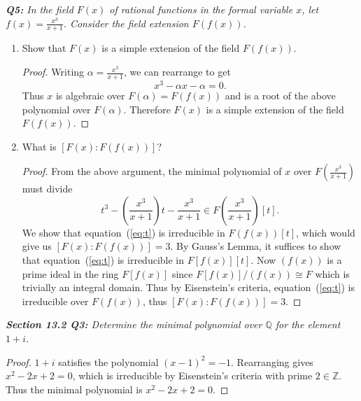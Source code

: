 \documentclass{article}
\begin{document}
\it \textbf{Q5:} In the field $F(x)$ of rational functions in the formal
  variable $x$, let $f(x)=\frac{x^3}{x+1}$. Consider the field extension
  $F(f(x))$.

  \begin{enumerate}[label={(\alph*)}]
    \item Show that $F(x)$ is a simple extension of the field $F(f(x))$.
      \begin{proof}
        Writing $\alpha=\frac{x^3}{x+1}$, we can rearrange to get
        \begin{equation}
          x^3-\alpha x-\alpha=0.
          \label{eq:x}
        \end{equation}
        Thus $x$ is algebraic over $F(\alpha)=F(f(x))$ and is a root of the
        above polynomial over $F(\alpha)$. Therefore $F(x)$ is a simple
        extension of the field $F(f(x))$.
      \end{proof}

    \item What is $[F(x):F(f(x))]$?
      \begin{proof}
        From the above argument, the minimal polynomial of $x$ over
        $F\left(\frac{x^3}{x+1} \right)$ must divide
        \begin{equation}
          t^3 -\left(\frac{x^3}{x+1} \right)t
          -\frac{x^3}{x+1}\in F\left(\frac{x^3}{x+1} \right)[t].
          \label{eq:t}
        \end{equation}
        We show that equation~(\ref{eq:t}) is irreducible in $F(f(x))[t]$,
        which would give us $[F(x):F(f(x))]=3$. By Gauss's Lemma, it
        suffices to show that equation~(\ref{eq:t}) is irreducible in
        $F[f(x)][t]$. Now $(f(x))$ is a prime ideal in the ring $F[f(x)]$
        since $F[f(x)]/(f(x))\cong F$ which is trivially an integral
        domain. Thus by Eisenstein's criteria, equation~(\ref{eq:t}) is
        irreducible over $F(f(x))$, thus $[F(x):F(f(x))]=3$.
      \end{proof}
  \end{enumerate}

\it \textbf{Section 13.2 Q3:} Determine the minimal polynomial over
  $\mathbb{Q}$ for the element $1+i$.

  \begin{proof}
    $1+i$ satisfies the polynomial $(x-1)^2=-1$. Rearranging gives
    $x^2-2x+2=0$, which is irreducible by Eisenstein's criteria with prime
    $2\in\mathbb{Z}$. Thus the minimal polynomial is $x^2-2x+2=0$.
  \end{proof}
\end{document}
